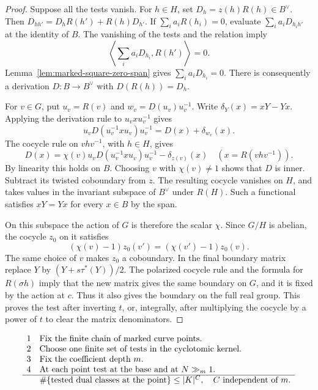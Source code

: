 \begin{proof}
Suppose all the tests vanish. For \(h\in H\), set
\(D_h=z(h)R(h)\in B^\vee\). Then
\(D_{hh'}=D_hR(h')+R(h)D_{h'}\).
If \(\sum_i a_iR(h_i)=0\), evaluate \(\sum_i a_i D_{h_i h'}\)
at the identity of \(B\). The vanishing of the tests and the
relation imply
\[
       \left\langle\sum_i a_i D_{h_i},R(h')\right\rangle=0 .
\]
Lemma~\ref{lem:marked-square-zero-span} gives
\(\sum_i a_i D_{h_i}=0\).
There is consequently a derivation \(D:B\to B^\vee\)
with \(D(R(h))=D_h\).

For \(v\in G\), put \(u_v=R(v)\) and \(w_v=D(u_v)u_v^{-1}\).
Write \(\delta_Y(x)=xY-Yx\). Applying the derivation rule to
\(u_v x u_v^{-1}\) gives
\[
 u_v D(u_v^{-1}x u_v)u_v^{-1}=D(x)+\delta_{w_v}(x).
\]
The cocycle rule on \(v h v^{-1}\), with \(h\in H\), gives
\[
 D(x)=\chi(v)u_v D(u_v^{-1}x u_v)u_v^{-1}
                                  -\delta_{z(v)}(x)
 \quad (x=R(v h v^{-1})).
\]
By linearity this holds on \(B\). Choosing \(v\) with
\(\chi(v)\ne1\) shows that \(D\) is inner. Subtract its twisted
coboundary from \(z\). The resulting cocycle vanishes on \(H\),
and takes values in the invariant subspace of \(B^\vee\) under
\(R(H)\). Such a functional satisfies \(xY=Yx\) for every
\(x\in B\) by the span.

On this subspace the action of \(G\)
is therefore the scalar \(\chi\). Since \(G/H\) is abelian,
the cocycle \(z_0\) on it satisfies
\[
 (\chi(v)-1)z_0(v')=(\chi(v')-1)z_0(v).
\]
The same choice of \(v\) makes \(z_0\) a coboundary. In the final
boundary matrix replace \(Y\) by \((Y+s\tau^*(Y))/2\).
The polarized cocycle rule and the formula for \(R(\sigma h)\)
imply that the new matrix gives the same boundary on \(G\),
and it is fixed by the action at \(c\). Thus it also gives the
boundary on the full real group. This proves the test after
inverting \(t\), or, integrally, after multiplying the cocycle
by a power of \(t\) to clear the matrix denominators.

\end{proof}

\begin{construction}
\[
\begin{array}{rl}
1&\text{Fix the finite chain of marked curve points.}\\
2&\text{Choose one finite set of tests in the cyclotomic kernel.}\\
3&\text{Fix the coefficient depth }m.\\
4&\text{At each point test at the base and at } N\gg_m1.\\ \hline
 &\#\{\text{tested dual classes at the point}\}\le |K|^{C},
      \quad C\text{ independent of }m .
\end{array}
\]
\caption{Order of choices for the paired determinant tests. The finite test set works across the fixed chain, while the bound on size may depend on the point.}\label{fig:marked-test-quantifiers}
\end{construction}

